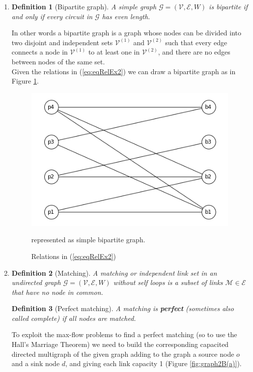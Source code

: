 \documentclass[
	12pt, %
]{fphw}
\newtheorem{definition}{Definition}
\begin{document}
\begin{enumerate}[{\bfseries (a)}]
    \item 
    \begin{definition}[Bipartite graph]
    A simple graph $\mathcal{G} = (\mathcal{V}, \mathcal{E}, W)$ is bipartite if and only if every circuit in $\mathcal{G}$ has even length.
    \end{definition}
    In other words a bipartite graph is a graph whose nodes can be divided into two disjoint and independent sets $\mathcal{V}^{(1)}$ and $\mathcal{V}^{(2)}$ such that every edge connects a node in $\mathcal{V}^{(1)}$ to at least one in $\mathcal{V}^{(2)}$, and there are no edges between nodes of the same set.\\
    Given the relations in (\ref{eq:eqRelEx2}) we can draw a bipartite graph as in Figure \ref{fig:figEx2a}.
    \begin{figure}[H]
        \centering
    	\includegraphics[width=0.5\columnwidth]{graph2a.png} %
    	\caption{Relations in (\ref{eq:eqRelEx2})} represented as simple bipartite graph.
        \label{fig:figEx2a}
    \end{figure}
    \item 
    \begin{definition}[Matching]
        A matching or independent link set in an undirected graph $\mathcal{G} = (\mathcal{V}, \mathcal{E}, W)$ without self loops is a subset of links $\mathcal{M} \in \mathcal{E}$ that have no node in common.
    \end{definition}
    \begin{definition}[Perfect matching]
        A matching is \textbf{perfect} (sometimes also called complete) if all nodes are matched.
    \end{definition}
    \vspace{5pt}
    To exploit the max-flow problems to find a perfect matching (so to use the Hall's Marriage Theorem) we need to build the corresponding capacited directed multigraph of the given graph adding to the graph a source node $o$ and a sink node $d$, and giving each link capacity 1 (Figure \ref{fig:graph2B(a)}).\\ 

\end{enumerate}
\end{document}
